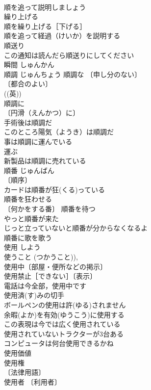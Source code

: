 \documentclass[8pt]{extreport}
\begin{document}
\begin{CJK}{UTF8}{min}
\\	順を追って説明しましょう 
\\	繰り上げる 
\\	順を繰り上げる［下げる］ 
\\	順を追って経過（けいか）を説明する 
\\	順送り 
\\	この通知は読んだら順送りにしてください 
\\	瞬間	しゅんかん	
\\	順調	じゅんちょう	順調な 〔申し分のない〕
\\	〔都合のよい〕
\\	((英)) 
\\	順調に 
\\	〔円滑（えんかつ）に〕
\\	手術後は順調だ 
\\	このところ陽気（ようき）は順調だ 
\\	事は順調に運んでいる 
\\	運ぶ　
\\	新製品は順調に売れている 
\\	順番	じゅんばん	
\\	〔順序〕
\\	カードは順番が狂(くる)っている 
\\	順番を狂わせる 
\\	〔何かをする番〕 順番を待つ 
\\	やっと順番が来た 
\\	じっと立っていないと順番が分からなくなるよ 
\\	順番に歌を歌う 
\\	使用	しよう	
\\	使うこと (つかうこと)), 
\\	使用中〔部屋・便所などの掲示〕 
\\	使用禁止［できない］〔表示〕 
\\	電話は今全部，使用中です 
\\	使用済(す)みの切手 
\\	ボールペンの使用は許(ゆる)されません 
\\	余暇(よか)を有効(ゆうこう)に使用する 
\\	この表現は今では広く使用されている 
\\	使用されていないトラクターが3台ある 
\\	コンピュータは何台使用できるかね 
\\	使用価値 
\\	使用権 
\\	〔法律用語〕
\\	使用者 〔利用者〕

\end{CJK}
\end{document}
